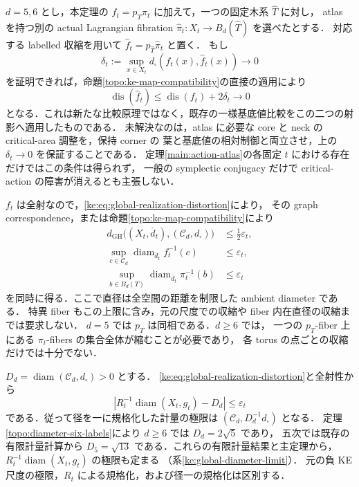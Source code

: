 \begin{remark}\label{ke:atlas-ke-value-criterion}
$d=5,6$ とし，本定理の $f_t=p_T\pi_t$ に加えて，一つの固定木系 $\widehat T$ に対し，
atlas を持つ別の actual Lagrangian fibration
$\widehat\pi_t:X_t\to B_d(\widehat T)$ を選べたとする．
対応する labelled 収縮を用いて $\widehat f_t=p_{\widehat T}\widehat\pi_t$ と置く．
もし
\[
 \delta_t:=\sup_{x\in X_t}d_\square(f_t(x),\widehat f_t(x))\longrightarrow0
\]
を証明できれば，命題\ref{topo:ke-map-compatibility}の直接の適用により
\[
 \operatorname{dis}(\widehat f_t)
 \le\operatorname{dis}(f_t)+2\delta_t\longrightarrow0
\]
となる．これは新たな比較原理ではなく，既存の一様基底値比較をこの二つの射影へ適用したものである．
未解決なのは，atlas に必要な core と neck の critical-area 調整を，保持 corner の
葉と基底値の相対制御と両立させ，上の $\delta_t\to0$ を保証することである．
定理\ref{main:action-atlas}の各固定 $t$ における存在だけではこの条件は得られず，
一般の symplectic conjugacy だけで critical-action の障害が消えるとも主張しない．
\end{remark}

$f_t$ は全射なので，\eqref{ke:eq:global-realization-distortion}により，
その graph correspondence，または命題\ref{topo:ke-map-compatibility}により
\begin{align*}
 d_{\mathrm{GH}}\bigl((X_t,\bar d_t),(\mathcal C_d,d_\square)\bigr)
 &\le\tfrac12\varepsilon_t,\\
 \sup_{c\in\mathcal C_d}
 \operatorname{diam}_{\bar d_t}f_t^{-1}(c)
 &\le\varepsilon_t,\\
 \sup_{b\in B_d(T)}
 \operatorname{diam}_{\bar d_t}\pi_t^{-1}(b)
 &\le\varepsilon_t
\end{align*}
を同時に得る．ここで直径は全空間の距離を制限した ambient diameter である．
特異 fiber もこの上限に含み，元の尺度での収縮や fiber 内在直径の収縮までは要求しない．
$d=5$ では $p_T$ は同相である．$d\ge6$ では，
一つの $p_T$-fiber 上にある $\pi_t$-fibers の集合全体が縮むことが必要であり，
各 torus の点ごとの収縮だけでは十分でない．

\begin{remark}[径を一にする規格化との関係]
\label{ke:global-realization-scale}
$D_d=\operatorname{diam}(\mathcal C_d,d_\square)>0$ とする．
\eqref{ke:eq:global-realization-distortion}と全射性から
\[
 \left|R_t^{-1}\operatorname{diam}(X_t,g_t)-D_d\right|
 \le\varepsilon_t
\]
である．従って径を一に規格化した計量の極限は
$(\mathcal C_d,D_d^{-1}d_\square)$ となる．
定理\ref{topo:diameter-six-labels}により $d\ge6$ では $D_d=2\sqrt5$ であり，
五次では既存の有限計量計算\cite[\texttt{thm:intro-diameter-C5}]{KECubicalCurrent}から
$D_5=\sqrt{13}$ である．これらの有限計量結果と主定理から，
$R_t^{-1}\operatorname{diam}(X_t,g_t)$ の極限も定まる
（系\ref{ke:global-diameter-limit}）．
元の負 KE 尺度の極限，$R_t$ による規格化，および径一の規格化は区別する．
\end{remark}

